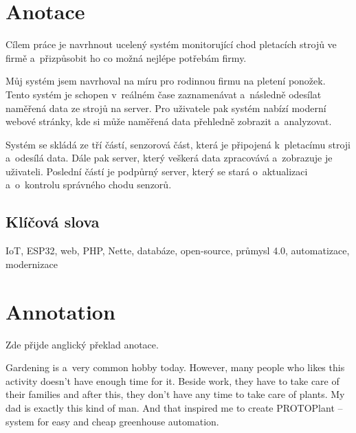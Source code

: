 \documentclass{template/socthesis}
\author{Jakub Andrýsek} %
\begin{document}

\maketitle %



\pagestyle{empty}

\section*{Anotace}
Cílem práce je navrhnout ucelený systém monitorující chod pletacích strojů ve firmě a~přizpůsobit ho co možná nejlépe potřebám firmy.

Můj systém jsem navrhoval na míru pro rodinnou firmu na pletení ponožek. 
Tento systém je schopen v~reálném čase zaznamenávat a~následně odesílat naměřená data ze strojů na server. 
Pro uživatele pak systém nabízí moderní webové stránky, kde si může naměřená data přehledně zobrazit a~analyzovat.

Systém se skládá ze tří částí, senzorová část, která je připojená k~pletacímu stroji a~odesílá data.
Dále pak server, který veškerá data zpracovává a~zobrazuje je uživateli.
Poslední částí je podpůrný server, který se stará o~aktualizaci a~o~kontrolu správného chodu senzorů.

\subsection*{Klíčová slova}


IoT, ESP32, web, PHP, Nette, databáze, open-source, průmysl 4.0, automatizace, modernizace


\newpage %

\vspace{20mm}

\section*{Annotation}
\color{mygreen}
Zde přijde anglický překlad anotace.
\color{black}

Gardening is a~very common hobby today. However, many people who likes this activity doesn't have enough time for it. 
Beside work, they have to take care of their families and after this, they don't have any time to take care of plants. 
My dad is exactly this kind of man. 
And that inspired me to create PROTOPlant -- system for easy and cheap greenhouse automation.
\end{document}
